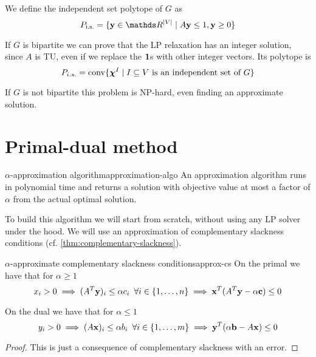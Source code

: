 \documentclass[12pt]{extarticle}
\renewcommand{\vec}[1]{\bvec{#1}}
\begin{document}
We define the independent set polytope of $G$ as
\begin{equation}
	P_\text{i.s.} = \{ \vec y \in \R^\abs{V} \mid A \vec y \leq 1, \vec y \geq 0\}
\end{equation}

If $G$ is bipartite we can prove that the LP relaxation has an integer solution, since $A$ is TU,
even if we replace the $\vec 1$s with other integer vectors. Its polytope is
\begin{equation}
	P_{i.s.} = \mathrm{conv}\{ \vec \chi^I \mid I \subseteq V \text{ is an independent set of } G\}
\end{equation}

If $G$ is not bipartite this problem is NP-hard, even finding an approximate solution.

\section{Primal-dual method}

\begin{definition}{$\alpha$-approximation algorithm}{approximation-algo}
	An approximation algorithm runs in polynomial time and returns a solution with objective value at
	most a factor of $\alpha$ from the actual optimal solution.
\end{definition}

To build this algorithm we will start from scratch, without using any LP solver under the hood.
We will use an approximation of complementary slackness conditions
(cf. \cref{thm:complementary-slackness}).

\begin{proposition}{$\alpha$-approximate complementary slackness conditions}{approx-cs}
	On the primal we have that for $\alpha \geq 1$
	\begin{equation}
		x_i > 0 \implies (A^T \vec y)_i \leq \alpha c_i \enspace \forall i \in \{1, \dots, n\}
		\implies \vec x^T(A^T \vec y - \alpha \vec c) \leq 0
	\end{equation}


	On the dual we have that for $\alpha \leq 1$
	\begin{equation}
		y_i > 0 \implies (A \vec x)_i \leq \alpha b_i \enspace \forall i \in \{1, \dots, m\}
		\implies \vec y^T(\alpha \vec b - A \vec x) \leq 0
	\end{equation}
\end{proposition}

\begin{proof}
	This is just a consequence of complementary slackness with an error.
\end{proof}
\end{document}
